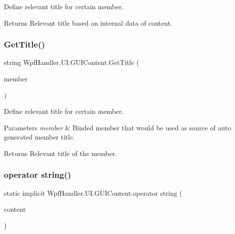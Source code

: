 Define relevant title for certain member. 

\begin{DoxyReturn}{Returns}
Relevant title based on internal data of content.
\end{DoxyReturn}
\mbox{\label{class_wpf_handler_1_1_u_i_1_1_g_u_i_content_a36c48561703ca7b73f21187ee9ff08bb}} 
\subsubsection{\texorpdfstring{Get\+Title()}{GetTitle()}\hspace{0.1cm}{\footnotesize\ttfamily [2/2]}}
{\footnotesize\ttfamily string Wpf\+Handler.\+U\+I.\+G\+U\+I\+Content.\+Get\+Title (\begin{DoxyParamCaption}\item[{Member\+Info}]{member }\end{DoxyParamCaption})}



Define relevant title for certain member. 


\begin{DoxyParams}{Parameters}
{\em member} & Binded member that would be used as source of auto generated member title.\\
\hline
\end{DoxyParams}
\begin{DoxyReturn}{Returns}
Relevant title of the member.
\end{DoxyReturn}
\mbox{\label{class_wpf_handler_1_1_u_i_1_1_g_u_i_content_a0a59156d78345550a413d155791e1137}} 
\subsubsection{\texorpdfstring{operator string()}{operator string()}}
{\footnotesize\ttfamily static implicit Wpf\+Handler.\+U\+I.\+G\+U\+I\+Content.\+operator string (\begin{DoxyParamCaption}\item[{\mbox{\hyperlink{class_wpf_handler_1_1_u_i_1_1_g_u_i_content}{G\+U\+I\+Content}}}]{content }\end{DoxyParamCaption})\hspace{0.3cm}{\ttfamily [static]}}



